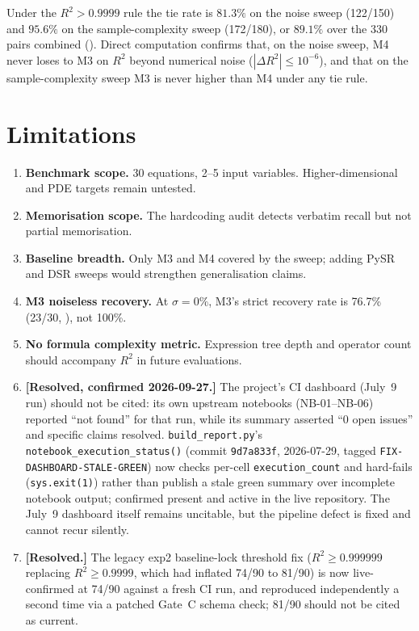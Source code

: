 \documentclass[twoside,11pt]{article}
\newcommand{\Rsq}{R^{2}}
\begin{document}
Under the $\Rsq>0.9999$ rule the tie rate is $81.3\%$ on the noise
sweep (122/150) and $95.6\%$ on the sample-complexity sweep (172/180), or
$89.1\%$ over the 330 pairs combined (). Direct computation
confirms that, on the noise sweep, M4 never loses to M3 on $\Rsq$ beyond
numerical noise ($|\Delta\Rsq|\le10^{-6}$), and that on the sample-complexity
sweep M3 is never higher than M4 under any tie rule.

\section{Limitations}
\label{suppb:limitations}

\begin{enumerate}
  \item \textbf{Benchmark scope.} 30 equations, 2--5 input variables.
    Higher-dimensional and PDE targets remain untested.
  \item \textbf{Memorisation scope.} The hardcoding audit detects verbatim
    recall but not partial memorisation.
  \item \textbf{Baseline breadth.} Only M3 and M4 covered by the sweep;
    adding PySR and DSR sweeps would strengthen generalisation claims.
  \item \textbf{M3 noiseless recovery.}  At $\sigma=0\%$, M3's strict recovery rate is 76.7\%
    (23/30, ), not 100\%.
  \item \textbf{No formula complexity metric.} Expression tree depth and
    operator count should accompany $\Rsq$ in future evaluations.
  \item \textbf{[Resolved, confirmed 2026-09-27.]} The project's CI
    dashboard (July~9 run) should not be cited: its own upstream notebooks
    (NB-01--NB-06) reported ``not found'' for that run, while its summary
    asserted ``0 open issues'' and specific claims resolved.
    \texttt{build\_report.py}'s \texttt{notebook\_execution\_status()}
    (commit \texttt{9d7a833f}, 2026-07-29, tagged
    \texttt{FIX-DASHBOARD-STALE-GREEN}) now checks per-cell
    \texttt{execution\_count} and hard-fails (\texttt{sys.exit(1)}) rather
    than publish a stale green summary over incomplete notebook output;
    confirmed present and active in the live repository. The July~9
    dashboard itself remains uncitable, but the pipeline defect is fixed
    and cannot recur silently.
  \item \textbf{[Resolved.]} The legacy exp2 baseline-lock threshold
    fix ($R^2 \geq 0.999999$ replacing $R^2 \geq 0.9999$, which had
    inflated 74/90 to 81/90) is now live-confirmed at 74/90 against a
    fresh CI run, and reproduced independently a second time via a
    patched Gate~C schema check; 81/90 should not be cited as current.
\end{enumerate}
\end{document}

